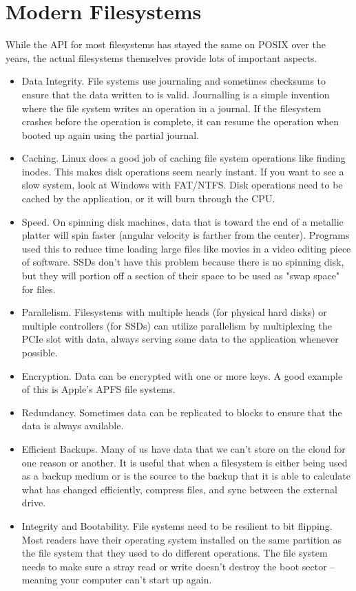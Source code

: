 \section{Modern Filesystems}

While the API for most filesystems has stayed the same on POSIX over the years, the actual filesystems themselves provide lots of important aspects.

\begin{itemize}
\item Data Integrity. File systems use journaling and sometimes checksums to ensure that the data written to is valid. Journalling is a simple invention where the file system writes an operation in a journal. If the filesystem crashes before the operation is complete, it can resume the operation when booted up again using the partial journal.
\item Caching. Linux does a good job of caching file system operations like finding inodes. This makes disk operations seem nearly instant. If you want to see a slow system, look at Windows with FAT/NTFS. Disk operations need to be cached by the application, or it will burn through the CPU.
\item Speed. On spinning disk machines, data that is toward the end of a metallic platter will spin faster (angular velocity is farther from the center). Programs used this to reduce time loading large files like movies in a video editing piece of software. SSDs don't have this problem because there is no spinning disk, but they will portion off a section of their space to be used as "swap space" for files.
\item Parallelism. Filesystems with multiple heads (for physical hard disks) or multiple controllers (for SSDs) can utilize parallelism by multiplexing the PCIe slot with data, always serving some data to the application whenever possible.
\item Encryption. Data can be encrypted with one or more keys. A good example of this is Apple's APFS file systems.
\item Redundancy. Sometimes data can be replicated to blocks to ensure that the data is always available.
\item Efficient Backups. Many of us have data that we can't store on the cloud for one reason or another. It is useful that when a filesystem is either being used as a backup medium or is the source to the backup that it is able to calculate what has changed efficiently, compress files, and sync between the external drive.
\item Integrity and Bootability. File systems need to be resilient to bit flipping. Most readers have their operating system installed on the same partition as the file system that they used to do different operations. The file system needs to make sure a stray read or write doesn't destroy the boot sector -- meaning your computer can't start up again.

\end{itemize}
